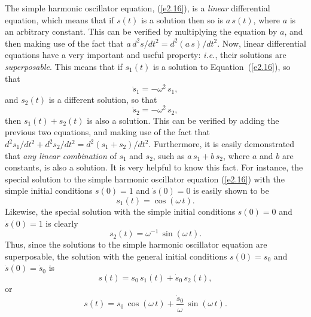 The simple harmonic oscillator equation, (\ref{e2.16}), is a {\em linear}\/ differential equation,
which  means that
if $s(t)$ is a solution  then so is $a\,s(t)$, where $a$ is
an arbitrary constant. This can be verified by multiplying the equation by $a$,
and then making use of the fact that $a\,d^2s/dt^2=d^2(a\,s)/dt^2$. Now, linear
differential equations have a very important and useful property: {\em i.e.}, their
solutions are {\em superposable}. This means that if $s_1(t)$ is a
solution to Equation~(\ref{e2.16}), so
that
\begin{equation}
\ddot{s}_1=-\omega^2\,s_1,
\end{equation}
and
$s_2(t)$ is a different solution, so that
\begin{equation}
\ddot{s}_2=-\omega^2\,s_2,
\end{equation}
then $s_1(t)+s_2(t)$ is also a solution. This can be verified by adding the previous
two equations, and making use of the fact that $d^2s_1/dt^2+d^2 s_2/dt^2=d^2(s_1+s_2)/dt^2$. Furthermore, it is easily demonstrated that {\em any linear combination}\/ of $s_1$ and $s_2$,
such as $a\,s_1+b\,s_2$, where $a$ and $b$ are constants, is also a solution.
It is very helpful to know this fact. 
For instance, the special solution to the simple harmonic oscillator equation (\ref{e2.16}) with the simple initial
conditions $s(0) = 1$ and $\dot{s}(0) = 0$ is easily shown to be
\begin{equation}
s_1(t) = \cos(\omega\,t).
\end{equation}
Likewise, the special solution with the simple initial conditions $s(0)=0$ and $\dot{s}(0)=1$ is clearly
\begin{equation}
s_2(t) = \omega^{-1}\,\sin(\omega\,t).
\end{equation}
Thus, since the solutions to the simple harmonic oscillator equation are superposable, the
solution with the general initial conditions $s(0)=s_0$ and $\dot{s}(0)=\dot{s}_0$ is
\begin{equation}
 s(t)=s_0\,s_1(t) + \dot{s}_0\,s_2(t), 
 \end{equation}
 or
\begin{equation}
s(t) =  s_0\,\cos(\omega\,t)+ \frac{\dot{s}_0}{\omega}\,\sin(\omega\,t).
\end{equation}

